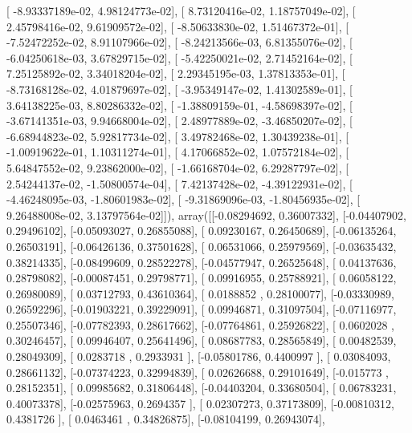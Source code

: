 \documentclass{article}
\begin{document}
       [ -8.93337189e-02,   4.98124773e-02],
       [  8.73120416e-02,   1.18757049e-02],
       [  2.45798416e-02,   9.61909572e-02],
       [ -8.50633830e-02,   1.51467372e-01],
       [ -7.52472252e-02,   8.91107966e-02],
       [ -8.24213566e-03,   6.81355076e-02],
       [ -6.04250618e-03,   3.67829715e-02],
       [ -5.42250021e-02,   2.71452164e-02],
       [  7.25125892e-02,   3.34018204e-02],
       [  2.29345195e-03,   1.37813353e-01],
       [ -8.73168128e-02,   4.01879697e-02],
       [ -3.95349147e-02,   1.41302589e-01],
       [  3.64138225e-03,   8.80286332e-02],
       [ -1.38809159e-01,  -4.58698397e-02],
       [ -3.67141351e-03,   9.94668004e-02],
       [  2.48977889e-02,  -3.46850207e-02],
       [ -6.68944823e-02,   5.92817734e-02],
       [  3.49782468e-02,   1.30439238e-01],
       [ -1.00919622e-01,   1.10311274e-01],
       [  4.17066852e-02,   1.07572184e-02],
       [  5.64847552e-02,   9.23862000e-02],
       [ -1.66168704e-02,   6.29287797e-02],
       [  2.54244137e-02,  -1.50800574e-04],
       [  7.42137428e-02,  -4.39122931e-02],
       [ -4.46248095e-03,  -1.80601983e-02],
       [ -9.31869096e-03,  -1.80456935e-02],
       [  9.26488008e-02,   3.13797564e-02]]), array([[-0.08294692,  0.36007332],
       [-0.04407902,  0.29496102],
       [-0.05093027,  0.26855088],
       [ 0.09230167,  0.26450689],
       [-0.06135264,  0.26503191],
       [-0.06426136,  0.37501628],
       [ 0.06531066,  0.25979569],
       [-0.03635432,  0.38214335],
       [-0.08499609,  0.28522278],
       [-0.04577947,  0.26525648],
       [ 0.04137636,  0.28798082],
       [-0.00087451,  0.29798771],
       [ 0.09916955,  0.25788921],
       [ 0.06058122,  0.26980089],
       [ 0.03712793,  0.43610364],
       [ 0.0188852 ,  0.28100077],
       [-0.03330989,  0.26592296],
       [-0.01903221,  0.39229091],
       [ 0.09946871,  0.31097504],
       [-0.07116977,  0.25507346],
       [-0.07782393,  0.28617662],
       [-0.07764861,  0.25926822],
       [ 0.0602028 ,  0.30246457],
       [ 0.09946407,  0.25641496],
       [ 0.08687783,  0.28565849],
       [ 0.00482539,  0.28049309],
       [ 0.0283718 ,  0.2933931 ],
       [-0.05801786,  0.4400997 ],
       [ 0.03084093,  0.28661132],
       [-0.07374223,  0.32994839],
       [ 0.02626688,  0.29101649],
       [-0.015773  ,  0.28152351],
       [ 0.09985682,  0.31806448],
       [-0.04403204,  0.33680504],
       [ 0.06783231,  0.40073378],
       [-0.02575963,  0.2694357 ],
       [ 0.02307273,  0.37173809],
       [-0.00810312,  0.4381726 ],
       [ 0.0463461 ,  0.34826875],
       [-0.08104199,  0.26943074],
\end{document}
